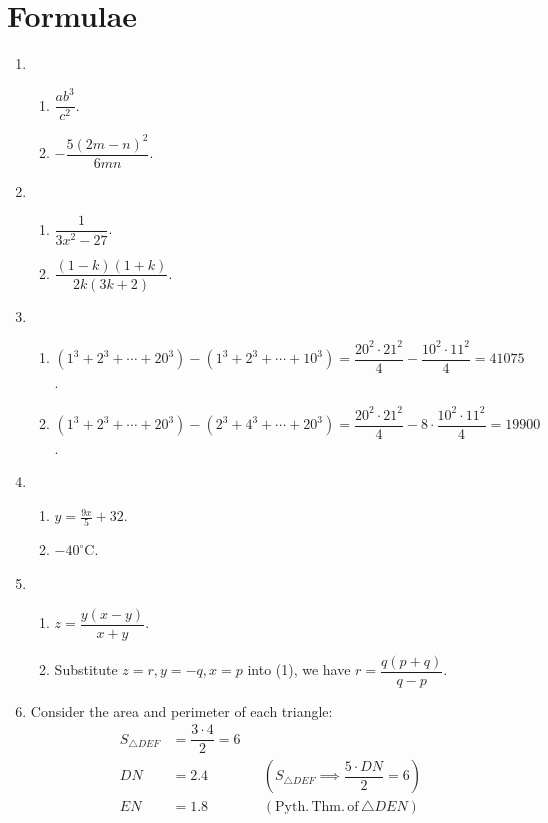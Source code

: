 \documentclass[12pt]{article}
\begin{document}
    \section{Formulae}
    \begin{enumerate}
        \item \begin{enumerate}
            \item $\dfrac{ab^3}{c^2}$.
            \item $-\dfrac{5(2m-n)^2}{6mn}$.
        \end{enumerate}
        \item \begin{enumerate}
            \item $\dfrac{1}{3x^2-27}$.
            \item $\dfrac{(1-k)(1+k)}{2k(3k+2)}$.
        \end{enumerate}
        \item \begin{enumerate}
            \item $(1^3+2^3+\cdots+20^3)-(1^3+2^3+\cdots+10^3) = \dfrac{20^2\cdot 21^2}{4} - \dfrac{10^2\cdot 11^2}{4} = 41075$.
            \item $(1^3+2^3+\cdots+20^3)-(2^3+4^3+\cdots+20^3) = \dfrac{20^2\cdot 21^2}{4}-8\cdot \dfrac{10^2\cdot 11^2}{4} = 19900$.
        \end{enumerate}
        \item \begin{enumerate}
            \item $y=\frac{9x}{5}+32$.
            \item $-40 ^\circ\mathrm{C}$.
        \end{enumerate}
        \item \begin{enumerate}
            \item $z=\dfrac{y(x-y)}{x+y}$.
            \item Substitute $z=r, y=-q, x=p$ into (1), we have $r=\dfrac{q(p+q)}{q-p}$.
        \end{enumerate}
        \item Consider the area and perimeter of each triangle:\begin{align*}
            S_{\triangle DEF}&=\dfrac{3\cdot 4}{2} = 6\\
            DN &= 2.4 &&(S_{\triangle DEF}\implies \dfrac{5\cdot DN}{2}=6)\\
            EN &= 1.8 &&(\mathrm{Pyth.\, Thm.\, of}\, \triangle DEN)\\

\end{align*}
\end{enumerate}
\end{document}
